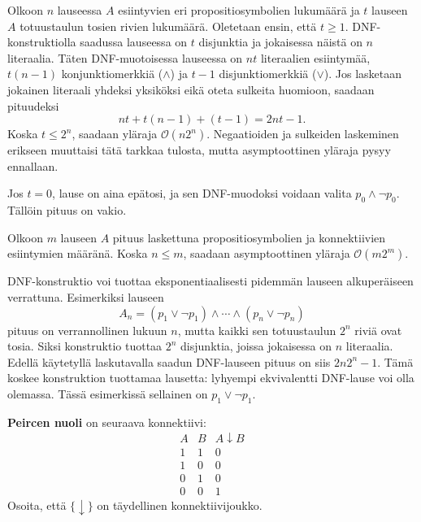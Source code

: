 \documentclass[11pt,a4paper]{amsart}
\begin{document}
\begin{solution}
Olkoon \(n\) lauseessa \(A\) esiintyvien eri propositiosymbolien lukumäärä
ja \(t\) lauseen \(A\) totuustaulun tosien rivien lukumäärä.
Oletetaan ensin, että \(t \geq 1\).
DNF-konstruktiolla saadussa lauseessa on \(t\) disjunktia
ja jokaisessa näistä on \(n\) literaalia. Täten DNF-muotoisessa lauseessa
on \(nt\) literaalien esiintymää, \(t(n - 1)\) konjunktiomerkkiä
(\(\land\)) ja \(t - 1\) disjunktiomerkkiä (\(\lor\)).
Jos lasketaan jokainen literaali yhdeksi yksiköksi eikä oteta sulkeita
huomioon, saadaan pituudeksi
\[
nt + t(n - 1) + (t - 1) = 2nt - 1.
\]
Koska \(t \leq 2^n\), saadaan yläraja \(\mathcal{O}(n2^n)\). Negaatioiden
ja sulkeiden laskeminen erikseen muuttaisi tätä tarkkaa tulosta,
mutta asymptoottinen
yläraja pysyy ennallaan.

Jos \(t=0\), lause on aina epätosi, ja sen DNF-muodoksi voidaan valita
\(p_0\land\neg p_0\). Tällöin pituus on vakio.

Olkoon \(m\) lauseen \(A\) pituus laskettuna propositiosymbolien ja
konnektiivien esiintymien määränä. Koska \(n \leq m\), saadaan asymptoottinen
yläraja \(\mathcal{O}(m2^m)\).

DNF-konstruktio voi tuottaa eksponentiaalisesti pidemmän lauseen
alkuperäiseen verrattuna. Esimerkiksi lauseen
\[
A_n=(p_1\lor\neg p_1)\land\cdots\land(p_n\lor\neg p_n)
\]
pituus on verrannollinen lukuun \(n\), mutta kaikki sen totuustaulun
\(2^n\) riviä ovat tosia. Siksi konstruktio tuottaa \(2^n\) disjunktia,
joissa jokaisessa on \(n\) literaalia. Edellä käytetyllä laskutavalla
saadun DNF-lauseen pituus on siis \(2n2^n-1\).
Tämä koskee konstruktion tuottamaa lausetta: lyhyempi ekvivalentti
DNF-lause voi olla olemassa. Tässä esimerkissä sellainen on
\(p_1\lor\neg p_1\).
\end{solution}

\begin{exercise}
\textbf{Peircen nuoli} on seuraava konnektiivi:
\[
\begin{array}{cc|c}
A & B & A \mathbin{\downarrow} B \\
\hline
1 & 1 & 0 \\
1 & 0 & 0 \\
0 & 1 & 0 \\
0 & 0 & 1
\end{array}
\]
Osoita, että \(\{\downarrow\}\) on täydellinen konnektiivijoukko.
\end{exercise}
\end{document}
